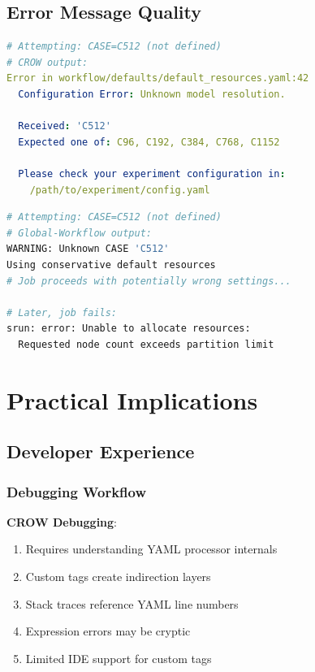 \documentclass[11pt,twoside]{article}
\newcommand{\crow}{\textsc{CROW}}
\newcommand{\gw}{\textsc{Global-Workflow}}
\begin{document}
\subsection{Error Message Quality}

\begin{lstlisting}[language=YAML, caption={\crow{} Error Message Example}]
# Attempting: CASE=C512 (not defined)
# CROW output:
Error in workflow/defaults/default_resources.yaml:42
  Configuration Error: Unknown model resolution.
  
  Received: 'C512'
  Expected one of: C96, C192, C384, C768, C1152
  
  Please check your experiment configuration in:
    /path/to/experiment/config.yaml
\end{lstlisting}

\begin{lstlisting}[language=Bash, caption={\gw{} Error Message Example}]
# Attempting: CASE=C512 (not defined)
# Global-Workflow output:
WARNING: Unknown CASE 'C512'
Using conservative default resources
# Job proceeds with potentially wrong settings...

# Later, job fails:
srun: error: Unable to allocate resources: 
  Requested node count exceeds partition limit
\end{lstlisting}

\section{Practical Implications}
\label{sec:practical}

\subsection{Developer Experience}

\subsubsection{Debugging Workflow}

\textbf{\crow{} Debugging}:
\begin{enumerate}[leftmargin=2em]
    \item Requires understanding YAML processor internals
    \item Custom tags create indirection layers
    \item Stack traces reference YAML line numbers
    \item Expression errors may be cryptic
    \item Limited IDE support for custom tags
\end{enumerate}
\end{document}
